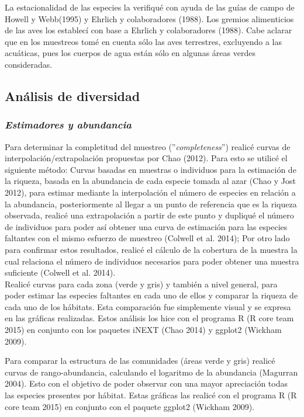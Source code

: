 \documentclass[letterpaper,12pt]{article}
\begin{document}
La estacionalidad de las especies la verifiqué con ayuda de las guías de campo de Howell y Webb(1995) y Ehrlich y colaboradores (1988). Los gremios alimenticios de las aves los establecí con base  a Ehrlich y colaboradores (1988). Cabe aclarar que en los muestreos tomé en cuenta sólo las aves terrestres, excluyendo a las acuáticas, pues los cuerpos de agua están sólo en algunas áreas verdes consideradas.
\subsection{Análisis de diversidad}
\subsubsection{\textit{Estimadores y abundancia}}
Para determinar la completitud del muestreo (''\textit{completeness}'') realicé curvas de interpolación/extrapolación propuestas por Chao (2012). Para esto se utilicé el siguiente método: Curvas basadas en muestras o individuos para la estimación de la riqueza, basada en la abundancia de cada especie tomada al azar (Chao y Jost 2012), para estimar mediante la interpolación el número de especies en relación a la abundancia, posteriormente al llegar a un punto de referencia que es la riqueza observada, realicé una extrapolación a partir de este punto y dupliqué el número de individuos para poder así obtener una curva de estimación para las especies faltantes con el mismo esfuerzo de muestreo (Colwell et al. 2014); Por otro lado para confirmar estos resultados, realicé el cálculo de la cobertura de la muestra la cual relaciona el número de individuos necesarios para poder obtener una muestra suficiente (Colwell et al. 2014).\\
Realicé curvas para cada zona (verde y gris) y también a nivel general, para poder estimar las especies faltantes en cada uno de ellos y comparar la riqueza de cada uno de los hábitats. Esta comparación fue simplemente visual y se expresa en las gráficas realizadas. Estos análisis los hice con el programa R (R core team 2015) en conjunto con los paquetes iNEXT (Chao 2014) y ggplot2 (Wickham 2009).

Para comparar la estructura de las comunidades (áreas verde y gris) realicé curvas de rango-abundancia, calculando el logaritmo de la abundancia (Magurran 2004). Esto con el objetivo de poder observar con una mayor apreciación todas las especies presentes por hábitat. Estas gráficas las realicé con el programa R (R core team 2015) en conjunto con el paquete ggplot2 (Wickham 2009).\\
\end{document}
